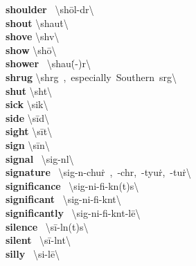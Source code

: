 \documentclass[10pt,a4paper]{article}
\begin{document}
\begin{multicols}{2}
\textbf{ shoulder }\quad \ \textbackslash \textprimstress sh\={o}l-d\textschwa r\textbackslash \\
\textbf{ shout }\quad \textbackslash \textprimstress shau\. t\textbackslash \\
\textbf{ shove }\quad \textbackslash \textprimstress sh\textschwa v\textbackslash \\
\textbf{ show }\quad \textbackslash \textprimstress sh\={o}\textbackslash \\
\textbf{ shower }\quad \ \textbackslash \textprimstress shau\. (-\textschwa )r\textbackslash \\
\textbf{ shrug }\quad \textbackslash \textprimstress shr\textschwa g\ ,\ especially\ Southern\ \textprimstress sr\textschwa g\textbackslash \\
\textbf{ shut }\quad \textbackslash \textprimstress sh\textschwa t\textbackslash \\
\textbf{ sick }\quad \textbackslash \textprimstress sik\textbackslash \\
\textbf{ side }\quad \textbackslash \textprimstress s\={i}d\textbackslash \\
\textbf{ sight }\quad \textbackslash \textprimstress s\={i}t\textbackslash \\
\textbf{ sign }\quad \textbackslash \textprimstress s\={i}n\textbackslash \\
\textbf{ signal }\quad \ \textbackslash \textprimstress sig-n\textsuperscript{\textreve}l\textbackslash \\
\textbf{ signature }\quad \ \textbackslash \textprimstress sig-n\textschwa -\textsecstress chu\. r\ ,\ -ch\textschwa r,\ -\textsecstress tyu\. r,\ -\textsecstress tu\. r\textbackslash \\
\textbf{ significance }\quad \ \textbackslash sig-\textprimstress ni-fi-k\textschwa n(t)s\textbackslash \\
\textbf{ significant }\quad \ \textbackslash sig-\textprimstress ni-fi-k\textschwa nt\textbackslash \\
\textbf{ significantly }\quad \ \textbackslash sig-\textprimstress ni-fi-k\textschwa nt-l\={e}\textbackslash \\
\textbf{ silence }\quad \ \textbackslash \textprimstress s\={i}-l\textschwa n(t)s\textbackslash \\
\textbf{ silent }\quad \ \textbackslash \textprimstress s\={i}-l\textschwa nt\textbackslash \\
\textbf{ silly }\quad \ \textbackslash \textprimstress si-l\={e}\textbackslash \\

\end{multicols}
\end{document}
